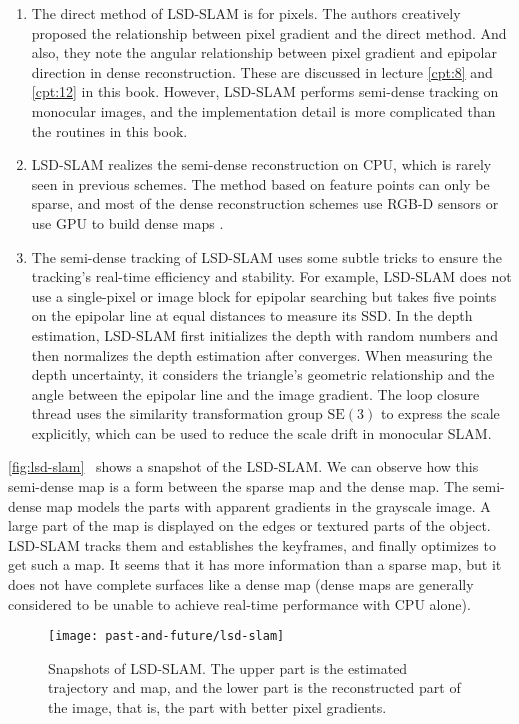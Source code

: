 \begin{enumerate}
	\item The direct method of LSD-SLAM is for pixels. The authors creatively proposed the relationship between pixel gradient and the direct method. And also, they note the angular relationship between pixel gradient and epipolar direction in dense reconstruction. These are discussed in lecture \ref{cpt:8} and \ref{cpt:12} in this book. However, LSD-SLAM performs semi-dense tracking on monocular images, and the implementation detail is more complicated than the routines in this book.
	\item LSD-SLAM realizes the semi-dense reconstruction on CPU, which is rarely seen in previous schemes. The method based on feature points can only be sparse, and most of the dense reconstruction schemes use RGB-D sensors or use GPU to build dense maps {\cite{Kerl2013}}. 
	\item The semi-dense tracking of LSD-SLAM uses some subtle tricks to ensure the tracking's real-time efficiency and stability. For example, LSD-SLAM does not use a single-pixel or image block for epipolar searching but takes five points on the epipolar line at equal distances to measure its SSD. In the depth estimation, LSD-SLAM first initializes the depth with random numbers and then normalizes the depth estimation after converges. When measuring the depth uncertainty, it considers the triangle's geometric relationship and the angle between the epipolar line and the image gradient. The loop closure thread uses the similarity transformation group $\mathrm{SE}(3)$ to express the scale explicitly, which can be used to reduce the scale drift in monocular SLAM.
\end{enumerate}

\autoref{fig:lsd-slam}~ shows a snapshot of the LSD-SLAM. We can observe how this semi-dense map is a form between the sparse map and the dense map. The semi-dense map models the parts with apparent gradients in the grayscale image. A large part of the map is displayed on the edges or textured parts of the object. LSD-SLAM tracks them and establishes the keyframes, and finally optimizes to get such a map. It seems that it has more information than a sparse map, but it does not have complete surfaces like a dense map (dense maps are generally considered to be unable to achieve real-time performance with CPU alone).

\begin{figure}[!ht]
	\centering
	\texttt{[image: past-and-future/lsd-slam]}
	\caption{Snapshots of LSD-SLAM. The upper part is the estimated trajectory and map, and the lower part is the reconstructed part of the image, that is, the part with better pixel gradients.}
	\label{fig:lsd-slam}
\end{figure}

